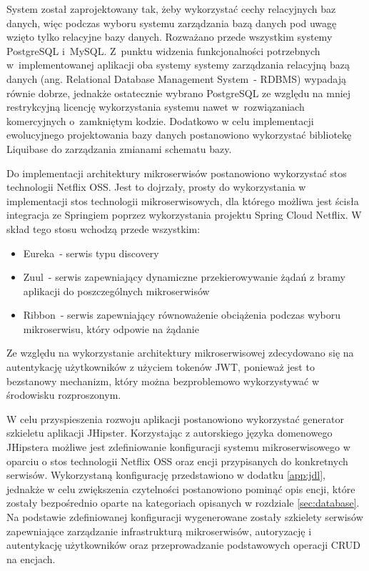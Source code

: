 \par
System został zaprojektowany tak, żeby wykorzystać cechy relacyjnych baz danych,
więc podczas wyboru systemu zarządzania bazą danych pod uwagę wzięto tylko relacyjne bazy danych.
Rozważano przede wszystkim systemy PostgreSQL\cite{tech:postgresql} i~MySQL\cite{tech:mysql}.
Z~punktu widzenia funkcjonalności potrzebnych w~implementowanej aplikacji oba systemy systemy zarządzania relacyjną bazą danych (ang. Relational Database Management System~- RDBMS) wypadają równie dobrze,
jednakże ostatecznie wybrano PostgreSQL ze względu na mniej restrykcyjną licencję wykorzystania systemu nawet w~rozwiązaniach komercyjnych o~zamkniętym kodzie.
Dodatkowo w celu implementacji ewolucyjnego projektowania bazy danych\cite{url:evolutionary-database} postanowiono wykorzystać bibliotekę Liquibase\cite{tech:liquibase} do zarządzania zmianami schematu bazy.

\par
Do implementacji architektury mikroserwisów postanowiono wykorzystać stos technologii Netflix OSS\cite{tech:netflix-oss}.
Jest to dojrzały, prosty do wykorzystania w implementacji stos technologii mikroserwisowych,
dla którego możliwa jest ścisła integracja ze Springiem poprzez wykorzystania projektu Spring Cloud Netflix\cite{tech:spring-cloud-netflix}.
W skład tego stosu wchodzą przede wszystkim:
\begin{itemize}
    \item Eureka\cite{tech:netflix-eureka}~- serwis typu discovery
    \item Zuul\cite{tech:netflix-zuul}~- serwis zapewniający dynamiczne przekierowywanie żądań z bramy aplikacji do poszczególnych mikroserwisów
    \item Ribbon\cite{tech:netflix-ribbon}~- serwis zapewniający równoważenie obciążenia podczas wyboru mikroserwisu, który odpowie na żądanie
\end{itemize}

\par
Ze względu na wykorzystanie architektury mikroserwisowej zdecydowano się na autentykację użytkowników z użyciem tokenów JWT\cite{url:jwt},
ponieważ jest to bezstanowy mechanizm, który można bezproblemowo wykorzystywać w środowisku rozproszonym.

\par
W celu przyspieszenia rozwoju aplikacji postanowiono wykorzystać generator szkieletu aplikacji JHipster\cite{tech:jhipster}.
Korzystając z autorskiego języka domenowego JHipstera możliwe jest zdefiniowanie konfiguracji systemu mikroserwisowego w oparciu o stos technologii Netflix OSS oraz encji przypisanych do konkretnych serwisów.
Wykorzystaną konfigurację przedstawiono w dodatku \ref{app:jdl}, jednakże w celu zwiększenia czytelności postanowiono pominąć opis encji, które zostały bezpośrednio oparte na kategoriach opisanych w rozdziale \ref{sec:database}.
Na podstawie zdefiniowanej konfiguracji wygenerowane zostały szkielety serwisów zapewniające zarządzanie infrastrukturą mikroserwisów, autoryzację i autentykację użytkowników oraz przeprowadzanie podstawowych operacji CRUD na encjach.

